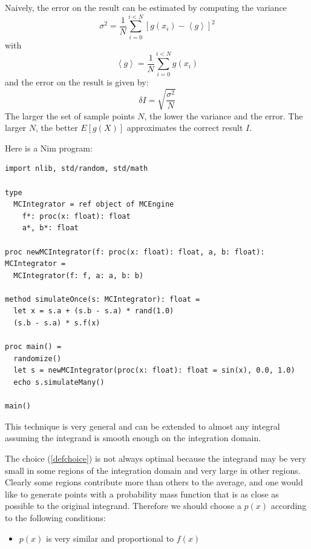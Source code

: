 \documentclass[justified, sixbynine]{tufte-book}
\def\ft{\small\tt}
\theoremstyle{plain}%
\newtheorem * {corollary}{Corollary}
\theoremstyle{definition}
\theoremstyle{remark}
\newtheorem * {remark}{Remark}
\newtheorem * {note}{Note}
\begin{document}
\begin{fullwidth}
Naively, the error on the result can be estimated by computing the variance
\begin{equation}
\sigma ^2 = \frac 1N\sum_{i=0}^{i<N}\left[ g(x_i)-\left\langle
g\right\rangle \right] ^2
\end{equation}
with
\begin{equation}
\left\langle g\right\rangle = \frac 1N\sum_{i=0}^{i<N}g(x_i)
\end{equation}
and the error on the result is given by:
\begin{equation}
\delta I=\sqrt{\frac{\sigma ^2}{N}}
\end{equation}
The larger the set of sample points $N$, the lower the variance and the
error. The larger $N$, the better $E[g(X)]$ approximates the correct result $%
I$.


Here is a Nim program:

\begin{lstlisting}[caption={in file: {\ft integrate.nim}}]
import nlib, std/random, std/math

type
  MCIntegrator = ref object of MCEngine
    f*: proc(x: float): float
    a*, b*: float

proc newMCIntegrator(f: proc(x: float): float, a, b: float): MCIntegrator =
  MCIntegrator(f: f, a: a, b: b)

method simulateOnce(s: MCIntegrator): float =
  let x = s.a + (s.b - s.a) * rand(1.0)
  (s.b - s.a) * s.f(x)

proc main() =
  randomize()
  let s = newMCIntegrator(proc(x: float): float = sin(x), 0.0, 1.0)
  echo s.simulateMany()

main()
\end{lstlisting}

This technique is very general and can be extended to almost any integral
assuming the integrand is smooth enough on the integration domain.

The choice (\ref{defchoice}) is not always optimal because the integrand may
be very small in some regions of the integration domain and very large in
other regions. Clearly some regions contribute more than others to the
average, and one would like to generate points with a probability mass
function that is as close as possible to the original integrand. Therefore
we should choose a $p(x)$ according to the following conditions:

\begin{itemize}
\item  $p(x)$ is very similar and proportional to $f(x)$


\end{itemize}
\end{fullwidth}
\end{document}
